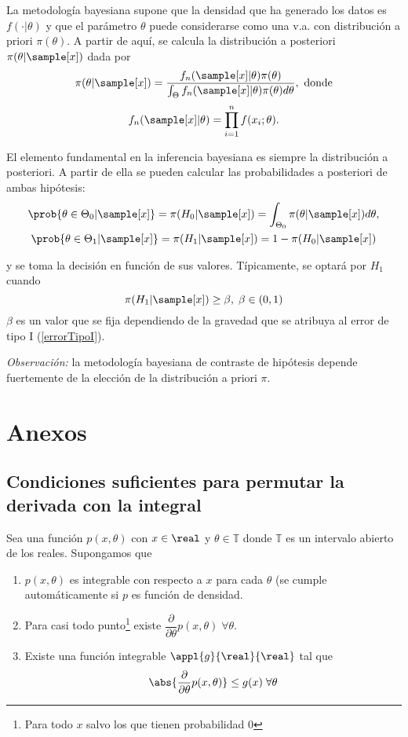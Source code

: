 \documentclass{apuntes}
\begin{document}
La metodología bayesiana supone que la densidad que ha generado los datos es $f(\cdot\vert\theta)$ y que el parámetro $\theta$ puede considerarse como una v.a. con distribución a priori $\pi(\theta)$. A partir de aquí, se calcula la distribución a posteriori $\pi(\theta\vert\sample[x])$ dada por
\[
\pi(\theta\vert\sample[x]) =
\frac{f_n(\sample[x]\vert\theta)\pi(\theta)}{\int_\Theta f_n(\sample[x]\vert\theta)\pi(\theta) d\theta}, \text{ donde}
\]
\[
f_n(\sample[x]\vert\theta) =
\prod\limits_{i=1}^{n} f(x_i;\theta).
\]

El elemento fundamental en la inferencia bayesiana es siempre la distribución a posteriori. A partir de ella se pueden calcular las probabilidades a posteriori de ambas hipótesis:
\begin{gather*}
\prob{\theta \in \Theta_0 \vert\sample[x]} =
\pi(H_0 \vert \sample[x]) =
\int_{\Theta_0} \pi(\theta \vert \sample[x]) d\theta,\\
\prob{\theta \in \Theta_1 \vert\sample[x]} =
\pi(H_1 \vert \sample[x]) =
1 - \pi(H_0 \vert \sample[x])
\end{gather*}

y se toma la decisión en función de sus valores. Típicamente, se optará por $H_1$ cuando
\[ \pi(H_1 \vert \sample[x]) \geq \beta, \; \beta \in (0,1)\]
$\beta$ es un valor que se fija dependiendo de la gravedad que se atribuya al error de tipo I (\ref{errorTipoI}).

\textit{Observación:} la metodología bayesiana de contraste de hipótesis depende fuertemente de la elección de la distribución a priori $\pi$.

\appendix
\chapter{Anexos}
\section{Condiciones suficientes para permutar la derivada con la integral}

\label{secConds}
Sea una función $p(x,\theta)$ con $x\in \real$ y $\theta \in \mathbb{T}$ donde $\mathbb{T}$ es un intervalo abierto de los reales. Supongamos que
\begin{enumerate}
\item $p(x,\theta)$ es integrable con respecto a $x$ para cada $\theta$ (se cumple automáticamente si $p$ es función de densidad.
\item Para casi todo punto\footnote{Para todo $x$ salvo los que tienen probabilidad 0} existe $\dfrac{\partial}{\partial\theta} p(x,\theta)\;\forall\theta$.
\item Existe una función integrable $\appl{g}{\real}{\real}$ tal que \[ \abs{\dfrac{\partial}{\partial\theta} p(x,\theta)}\leq g(x)\;\forall\theta \]
\end{enumerate}
\end{document}
